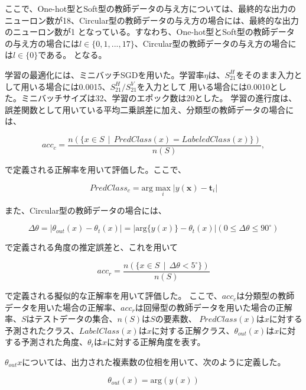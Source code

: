 \documentclass[11pt,a4paper,uplatex]{ujarticle}
\begin{document}
  ここで、One-hot型とSoft型の教師データの与え方については、最終的な出力のニューロン数が18、Circular型の教師データの与え方の場合には、最終的な出力のニューロン数が1
  となっている。すなわち、One-hot型とSoft型の教師データの与え方の場合には$l \in \{0,1,...,17\}$、Circular型の教師データの与え方の場合には$l \in \{0\}$である。
  となる。

  学習の最適化には、ミニバッチSGDを用いた。学習率$\eta$は、$S_{21}^H$をそのまま入力として用いる場合には0.0015、$S_{21}^{H}/S_{21}^{V}$を入力として
  用いる場合には0.0010とした。ミニバッチサイズは32、学習のエポック数は20とした。
  学習の進行度は、誤差関数として用いている平均二乗誤差に加え、分類型の教師データの場合には、

  \begin{equation}
    acc_{c} = \frac{n(\{x \in S \, \mid\, PredClass(x) = LabeledClass(x)\})}{n(S)},
  \end{equation} %

  で定義される正解率を用いて評価した。ここで、

  \begin{equation}
    PredClass_{c} = \mathrm{arg}\max_{i} |y(\mathbf{x}) - \mathbf{t}_i|
  \end{equation} %
  
  また、Circular型の教師データの場合には、

  \begin{equation}
    \Delta\theta = |\theta_{out}(x) - \theta_{t}(x)| =  |\mathrm{arg}\{y(x)\}- \theta_{t}(x)| ( 0 \le \Delta\theta \le 90^{\circ})
  \end{equation} %

  で定義される角度の推定誤差と、これを用いて

  \begin{equation}
    acc_{r} = \frac{n(\{x \in S \, \mid\, \Delta\theta < 5^{\circ}\})}{n(S)}
  \end{equation} %

  で定義される擬似的な正解率を用いて評価した。
  ここで、$acc_c$は分類型の教師データを用いた場合の正解率、$acc_r$は回帰型の教師データを用いた場合の正解率、$S$はテストデータの集合、$n(S)$は$S$の要素数、
  $PredClass(x)$は$x$に対する予測されたクラス、$LabelClass(x)$は$x$に対する正解クラス、$\theta_{out}(x)$は$x$に対する予測された角度、$\theta_{t}$は$x$に対する正解角度を表す。

  $\theta_{out}{x}$については、出力された複素数の位相を用いて、次のように定義した。

  \begin{equation}
    \theta_{out}(x) = \mathrm{arg}(y(x))
  \end{equation} %
\end{document}
